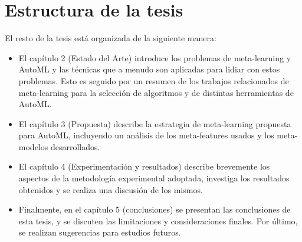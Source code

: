 \section{Estructura de la tesis}

El resto de la tesis está organizada de la siguiente manera:

\begin{itemize}
	\item El capítulo 2 (Estado del Arte) introduce los problemas de meta-learning y AutoML y las técnicas que a menudo son aplicadas para lidiar con estos problemas. Esto es seguido por un resumen de los trabajos relacionados de meta-learning para la selección de algoritmos y de distintas herramientas de AutoML.
	\item El capítulo 3 (Propuesta) describe la estrategia de meta-learning propuesta para AutoML, incluyendo un análisis de los meta-features usados y los meta-modelos desarrollados.
	\item El capítulo 4 (Experimentación y resultados) describe brevemente los aspectos de la metodología experimental adoptada, investiga los resultados obtenidos y se realiza una discusión de los mismos.
	\item Finalmente, en el capítulo 5 (conclusiones) se presentan las conclusiones de esta tesis, y se discuten las limitaciones y consideraciones finales. Por último, se realizan sugerencias para estudios futuros.
\end{itemize}